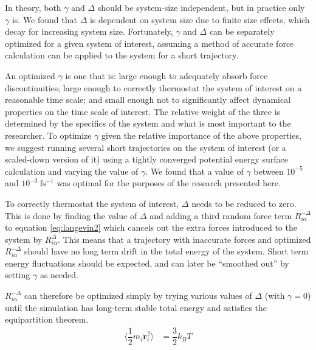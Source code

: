\documentclass[aps,prl,reprint,amsmath,amssymb]{revtex4-1}
\begin{document}

In theory, both $\gamma$ and $\Delta$ should be system-size independent, but in practice only $\gamma$ is.
We found that $\Delta$ is dependent on system size due to finite size effects, which decay for increasing system size.
Fortunately, $\gamma$ and $\Delta$ can be separately optimized for a given system of interest, assuming a method of accurate force calculation can be applied to the system for a short trajectory. 

An optimized $\gamma$ is one that is: large enough to adequately absorb force discontinuities; large enough to correctly thermostat the system of interest on a reasonable time scale; and small enough not to significantly affect dynamical properties on the time scale of interest. 
The relative weight of the three is determined by the specifics of the system and what is most important to the researcher. 
To optimize $\gamma$ given the relative importance of the above properties, we suggest running several short trajectories on the system of interest (or a scaled-down version of it) using a tightly converged potential energy surface calculation and varying the value of $\gamma$. 
We found that a value of $\gamma$ between $10^{-5}$ and $10^{-3}\ \mathrm{fs^{-1}}$ was optimal for the purposes of the research presented here.

To correctly thermostat the system of interest, $\Delta$ needs to be reduced to zero.
This is done by finding the value of $\Delta$ and adding a third random force term $R^{-\Delta}_{i\alpha}$ to equation \ref{eq:langevin2} which cancels out the extra forces introduced to the system by $R^{\Delta}_{i\alpha}$.
This means that a trajectory with inaccurate forces and optimized $R^{-\Delta}_{i\alpha}$ should have no long term drift in the total energy of the system. 
Short term energy fluctuations should be expected, and can later be ``smoothed out'' by setting $\gamma$ as needed.

$R^{-\Delta}_{i\alpha}$ can therefore be optimized simply by trying various values of $\Delta$ (with \mbox{$\gamma = 0$}) until the simulation has long-term stable total energy and satisfies the equipartition theorem. 
%
\begin{align}
\label{eq:eqipartition}
\langle \dfrac{1}{2} m_i \dot{\bm{r}}^{2}_{i} \rangle &= \dfrac{3}{2} k_{B} T
\end{align}
%
\end{document}

